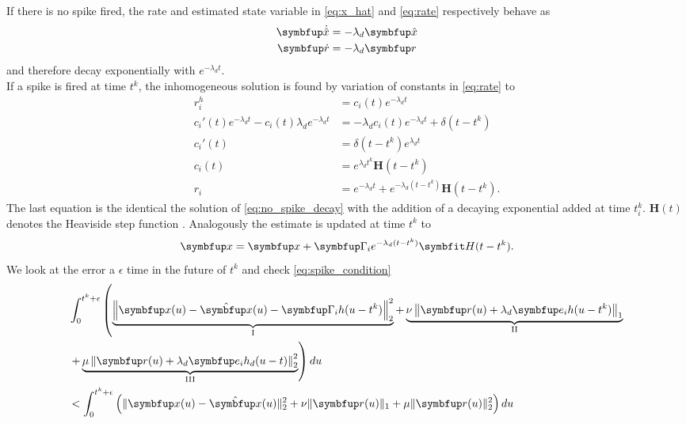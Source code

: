 If there is no spike fired, the rate and estimated state variable in \cref{eq:x_hat} and \cref{eq:rate} respectively behave as
\begin{equation}\label{eq:no_spike_decay}
\begin{aligned}
\bmu{\dot{\hat{x}}} &= -\lambda_d \bmu{\hat{x}}\\
\bmu{\dot{r}} &= -\lambda_d\bmu{r}
\end{aligned}
\end{equation}
and therefore decay exponentially with $e^{-\lambda_d t}$.\\
If a spike is fired at time $t^k$, the inhomogeneous solution is found by variation of constants in \cref{eq:rate} to
\begin{equation}\label{eq:rate_inhomo}
\begin{aligned}
r_i^h &= c_i(t)e^{-\lambda_d t}\\
c_i'(t) e^{-\lambda_d t} - c_i(t)\lambda_d e^{-\lambda_d t}&= -\lambda_d c_i(t)e^{-\lambda_d t} + \delta(t- t^k)\\
c_i'(t) &= \delta(t- t^k) e^{\lambda_d t}\\
c_i(t) &=  e^{\lambda_d t^k} \bm{H}(t-t^k)\\
r_i &=e^{-\lambda_d t} + e^{-\lambda_d (t-t^k)} \bm{H}(t-t^k).
\end{aligned}
\end{equation}
The last equation is the identical the solution of \cref{eq:no_spike_decay} with the addition of a decaying exponential added at time $t_i^k$. $\bm{H}(t)$ denotes the Heaviside step function . Analogously the estimate is updated at time $t^k$ to
\begin{equation}\label{eq:update_x_spike}
	\bmu{x} =  \bmu{x} + \bmu{\Gamma}_ie^{-\lambda_d (t-t^k)} \bm{H}(t-t^k).
\end{equation}
We look at the error a $\epsilon$ time in the future of $t^k$ and check \cref{eq:spike_condition}
\begin{equation}
\begin{aligned}
& \int_0^{t^k+\epsilon} \left(\underbrace{\left\|\bmu{x}(u)-\hat{\bmu{x}}(u)-\bmu{\Gamma}_i h(u-t^k)\right\|_2^2}_{\text{I}}+
\underbrace{\nu\left\|\bmu{r}(u)+\lambda_d \bmu{e}_i h(u-t^k)\right\|_1}_{\text{II}}\right.\\
& \left.+\underbrace{\mu\left\|\bmu{r}(u)+\lambda_d \bmu{e}_i h_d(u-t)\right\|_2^2}_{\text{III}}\right) d u\\
& <\int_0^{t^k+\epsilon} \left(\|\bmu{x}(u)-\hat{\bmu{x}}(u)\|_2^2+\nu\|\bmu{r}(u)\|_1+\mu\|\bmu{r}(u)\|_2^2\right)d u
\end{aligned}
\end{equation}
